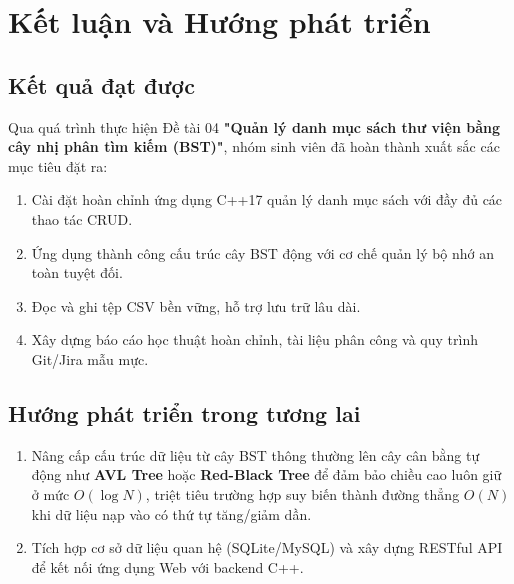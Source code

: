 \chapter*{Kết luận và Hướng phát triển}

\section*{Kết quả đạt được}
Qua quá trình thực hiện Đề tài 04 \textbf{"Quản lý danh mục sách thư viện bằng cây nhị phân tìm kiếm (BST)"}, nhóm sinh viên đã hoàn thành xuất sắc các mục tiêu đặt ra:
\begin{enumerate}
    \item Cài đặt hoàn chỉnh ứng dụng C++17 quản lý danh mục sách với đầy đủ các thao tác CRUD.
    \item Ứng dụng thành công cấu trúc cây BST động với cơ chế quản lý bộ nhớ an toàn tuyệt đối.
    \item Đọc và ghi tệp CSV bền vững, hỗ trợ lưu trữ lâu dài.
    \item Xây dựng báo cáo học thuật hoàn chỉnh, tài liệu phân công và quy trình Git/Jira mẫu mực.
\end{enumerate}

\section*{Hướng phát triển trong tương lai}
\begin{enumerate}
    \item Nâng cấp cấu trúc dữ liệu từ cây BST thông thường lên cây cân bằng tự động như \textbf{AVL Tree} hoặc \textbf{Red-Black Tree} để đảm bảo chiều cao luôn giữ ở mức $O(\log N)$, triệt tiêu trường hợp suy biến thành đường thẳng $O(N)$ khi dữ liệu nạp vào có thứ tự tăng/giảm dần.
    \item Tích hợp cơ sở dữ liệu quan hệ (SQLite/MySQL) và xây dựng RESTful API để kết nối ứng dụng Web với backend C++.
\end{enumerate}
